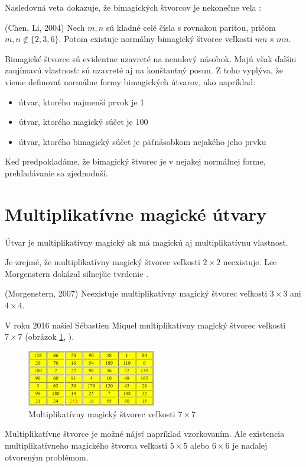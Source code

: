 Nasledovná veta dokazuje, že bimagických štvorcov je nekonečne veľa \cite{bimagic}:

\begin{theorem} (Chen, Li, 2004) Nech $m,n$ sú kladné celé čísla s rovnakou paritou, pričom $m,n \notin \{2,3,6\}$. Potom existuje normálny bimagický štvorec veľkosti $mn \times mn$.
\end{theorem}

Bimagické štvorce sú evidentne uzavreté na nenulový násobok. Majú však ďalšiu zaujímavú vlastnosť: sú uzavreté aj na konštantný posun. Z toho vyplýva, že vieme definovať normálne formy bimagických útvarov, ako napríklad:
\begin{itemize}
\item útvar, ktorého najmenší prvok je 1
\item útvar, ktorého magický súčet je 100
\item útvar, ktorého bimagický súčet je päťnásobkom nejakého jeho prvku
\end{itemize}

Keď predpokladáme, že bimagický štvorec je v nejakej normálnej forme, prehľadávanie sa zjednoduší. \\

\section{Multiplikatívne magické útvary}
\begin{definition} Útvar je multiplikatívny magický ak má magickú aj multiplikatívnu vlastnosť.
\end{definition}

Je zrejmé, že multiplikatívny magický štvorec veľkosti $2 \times 2$ neexistuje. Lee Morgenstern dokázal silnejšie tvrdenie \cite{multimagie}.

\begin{theorem} (Morgenstern, 2007) Neexistuje multiplikatívny magický štvorec veľkosti $3 \times 3$ ani $4 \times 4$.
\end{theorem}

V roku 2016 našiel Sébastien Miquel multiplikatívny magický štvorec veľkosti $7 \times 7$ (obrázok \ref{obr:fig_miquel_addmult_7x7}, \cite{multimagie}).

\begin{figure}[H]
\centerline{\includegraphics[width=0.5\textwidth]{images/miquel_addmult_7x7}}
\caption[Multiplikatívny magický štvorec veľkosti $7 \times 7$]{Multiplikatívny magický štvorec veľkosti $7 \times 7$ \cite{multimagie}}
\label{obr:fig_miquel_addmult_7x7}
\end{figure}

Multiplikatívne štvorce je možné nájsť napríklad vzorkovaním. Ale existencia multiplikatívneho magického štvorca veľkosti $5 \times 5$ alebo $6 \times 6$ je naďalej otvoreným problémom.











